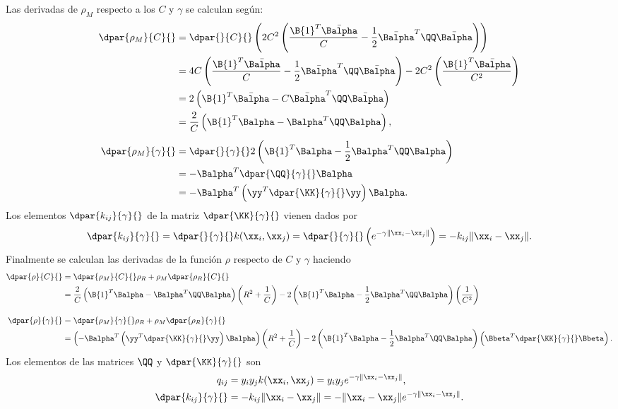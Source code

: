 Las derivadas de $\rho_M$ respecto a los  $C$ y $\gamma$ se
calculan según:
%
\begin{align}
    \dpar{\rho_M}{C}{}
    &= \dpar{}{C}{}\left( 2C^2\left(\frac{\B{1}^T\bar{\Balpha}}{C} -
    \frac{1}{2}\bar{\Balpha}^T\QQ\bar{\Balpha}\right)
    \right) \nonumber\\
    &= 4C \left(\frac{\B{1}^T\bar{\Balpha}}{C} -
    \frac{1}{2}\bar{\Balpha}^T\QQ\bar{\Balpha}\right)
    - 2C^2 \left(\frac{\B{1}^T\bar{\Balpha}}{C^2} \right) \nonumber\\
    &= 2\left(\B{1}^T\bar{\Balpha}
    - C \bar{\Balpha}^T\QQ\bar{\Balpha}\right) \nonumber\\
    &= \frac{2}{C} \left(\B{1}^T\Balpha - \Balpha^T\QQ\Balpha\right),\\[1ex]
    \dpar{\rho_M}{\gamma}{}
    &= \dpar{}{\gamma}{}
    2\left(  \B{1}^T\Balpha-\frac{1}{2}\Balpha^T\QQ\Balpha \right) \nonumber\\
    &= - \Balpha^T \dpar{\QQ}{\gamma}{}\Balpha \nonumber\\
    & = - \Balpha^T \left(\yy^T \dpar{\KK}{\gamma}{}\yy\right) \Balpha.
\end{align}
%
Los elementos $\dpar{k_{ij}}{\gamma}{}$ de la matriz $\dpar{\KK}{\gamma}{}$
vienen dados por
%
\begin{align}
  \dpar{k_{ij}}{\gamma}{}
  = \dpar{}{\gamma}{}k(\xx_i,\xx_j)
  = \dpar{}{\gamma}{} \left(e^{-\gamma\|\xx_i-\xx_j\|}\right)
  = -k_{ij}\|\xx_i-\xx_j\|.
\end{align}
%
Finalmente se calculan las derivadas de la función $\rho$ respecto de
$C$ y $\gamma$ haciendo
%
\begin{align}
    \dpar{\rho}{C}{} &= \dpar{\rho_M}{C}{} \rho_R + \rho_M \dpar{\rho_R}{C}{} \nonumber\\
    &= \frac{2}{C} \left(\B{1}^T\Balpha - \Balpha^T\QQ\Balpha\right) \left( R^2 + \frac{1}{C} \right)
    - 2\left(  \B{1}^T\Balpha-\frac{1}{2}\Balpha^T\QQ\Balpha \right)
    \left( \frac{1}{C^2} \right) \label{drho-dc} \\[1em]
    \dpar{\rho}{\gamma}{} &= \dpar{\rho_M}{\gamma}{} \rho_R + \rho_M \dpar{\rho_R}{\gamma}{}\nonumber\\
    &= \left( - \Balpha^T \left(\yy^T \dpar{\KK}{\gamma}{}\yy\right) \Balpha \right)
    \left( R^2 + \frac{1}{C} \right)
    - 2\left(  \B{1}^T\Balpha-\frac{1}{2}\Balpha^T\QQ\Balpha \right)
    \left( \Bbeta^T \dpar{\KK}{\gamma}{} \Bbeta \right). \label{drho-dgamma}
\end{align}
%
Los elementos de las matrices $\QQ$ y $\dpar{\KK}{\gamma}{}$ son
%
\begin{align}
  q_{ij}&=y_i y_j k(\xx_i,\xx_j)= y_i y_j e^{-\gamma\|\xx_i-\xx_j\|}, \\
  \dpar{k_{ij}}{\gamma}{}&=-k_{ij}\|\xx_i-\xx_j\| = -\|\xx_i-\xx_j\|e^{-\gamma\|\xx_i-\xx_j\|}.
\end{align}
%
